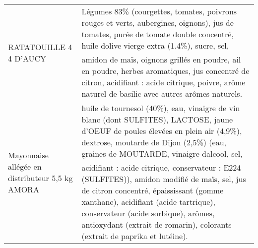 \begin{longtable}{p{5cm}p{10cm}}
                                                                                   RATATOUILLE 4 4 D'AUCY &                                                                                                                                                                                                                                                                                                                                                                                                                                                                                                                                                                                                                                                     Légumes 83\% (courgettes, tomates, poivrons rouges et verts, aubergines, oignons), jus de tomates, purée de tomate double concentré, huile dolive vierge extra (1.4\%), sucre, sel, amidon de maïs, oignons grillés en poudre, ail en poudre, herbes aromatiques, jus concentré de citron, acidifiant : acide citrique, poivre, arôme naturel de basilic avec autres arômes naturels. \\
                                                          Mayonnaise allégée en distributeur 5,5 kg AMORA &                                                                                                                                                                                                                                                                                                                                                                                                                                                                                                            huile de tournesol (40\%), eau, vinaigre de vin blanc (dont SULFITES), LACTOSE, jaune d'OEUF de poules élevées en plein air (4,9\%), dextrose, moutarde de Dijon (2,5\%) (eau, graines de MOUTARDE, vinaigre dalcool, sel, acidifiant : acide citrique, conservateur : E224 (SULFITES)), amidon modifié de maïs, sel, jus de citron concentré, épaississant (gomme xanthane), acidifiant (acide tartrique), conservateur (acide sorbique), arômes, antioxydant (extrait de romarin), colorants (extrait de paprika et lutéine). \\

\end{longtable}
